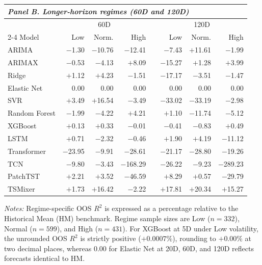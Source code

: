 \documentclass[runningheads,orivec]{llncs}
\begin{document}
\begin{table}[htbp]
{\vspace{6pt}
\setlength{\tabcolsep}{5pt}
\begin{tabular}{lrrr@{\hspace{8pt}}c@{\hspace{8pt}}rrr}
\hline
\multicolumn{8}{l}{\textit{Panel B. Longer-horizon regimes (60D and 120D)}} \\
\hline
 & \multicolumn{3}{c}{60D} & & \multicolumn{3}{c}{120D} \\
\cline{2-4}\cline{6-8}
Model & Low & Norm. & High & & Low & Norm. & High \\
\hline
ARIMA         & $-$1.30  & $-$10.76 & $-$12.41  & & $-$7.43  & $+$11.61 & $-$1.99 \\
ARIMAX        & $-$0.53  & $-$4.13  & $+$8.09   & & $-$15.27 & $+$1.28  & $+$3.99 \\
Ridge         & $+$1.12  & $+$4.23  & $-$1.51   & & $-$17.17 & $-$3.51  & $-$1.47 \\
Elastic Net   & 0.00     & 0.00     & 0.00      & & 0.00     & 0.00     & 0.00 \\
SVR           & $+$3.49  & $+$16.54 & $-$3.49   & & $-$33.02 & $-$33.19 & $-$2.98 \\
Random Forest & $-$1.99  & $-$4.22  & $+$4.21   & & $+$1.10  & $-$11.74 & $-$5.12 \\
XGBoost       & $+$0.13  & $+$0.33  & $-$0.01   & & $-$0.41  & $-$0.83  & $+$0.49 \\
LSTM          & $+$0.71  & $-$2.32  & $-$0.46   & & $+$1.90  & $+$4.19  & $-$11.12 \\
Transformer   & $-$23.95 & $-$9.91  & $-$28.61  & & $-$21.17 & $-$28.80 & $-$19.26 \\
TCN           & $-$9.80  & $-$3.43  & $-$168.29 & & $-$26.22 & $-$9.23  & $-$289.23 \\
PatchTST      & $+$2.21  & $+$3.52  & $-$46.59  & & $+$8.29  & $+$0.57  & $-$29.79 \\
TSMixer       & $+$1.73  & $+$16.42 & $-$2.22   & & $+$17.81 & $+$20.34 & $+$15.27 \\
\hline
\end{tabular}}
\par\vspace{4pt}\parbox{\linewidth}{\scriptsize\textit{Notes:} Regime-specific OOS $R^2$ is expressed as a percentage relative to the Historical Mean (HM) benchmark. Regime sample sizes are Low ($n=332$), Normal ($n=599$), and High ($n=431$). For XGBoost at 5D under Low volatility, the unrounded OOS $R^2$ is strictly positive ($+0.0007\%$), rounding to $+0.00\%$ at two decimal places, whereas $0.00$ for Elastic Net at 20D, 60D, and 120D reflects forecasts identical to HM.}
\end{table}
\end{document}
